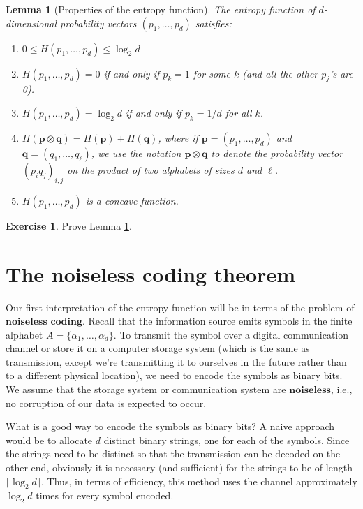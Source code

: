 \documentclass[11pt]{report}
\theoremstyle{plain}
\newtheorem{lem}[thm]{Lemma}
\theoremstyle{definition}
\newtheorem{xexercise}[thm]{Exercise}
\begin{document}
\begin{lem}[Properties of the entropy function]
\label{lem-entropy-properties}
The entropy function of $d$-dimensional probability vectors $(p_1,\ldots,p_d)$ satisfies:

\begin{enumerate}[label=\arabic*.]
\item $0 \le H(p_1,\ldots,p_d) \le \log_2 d$
\item $H(p_1,\ldots,p_d)=0$ if and only if $p_k=1$ for some $k$ (and all the other $p_j$'s are 0).
\item $H(p_1,\ldots,p_d)=\log_2 d$ if and only if $p_k=1/d$ for all $k$.
\item $H(\mathbf{p}\otimes \mathbf{q}) = H(\mathbf{p}) + H(\mathbf{q})$, where if $\mathbf{p}=(p_1,\ldots,p_d)$ and $\mathbf{q}=(q_1,\ldots,q_\ell)$, we use the notation $\mathbf{p}\otimes\mathbf{q}$ to denote the probability vector $(p_i q_j)_{i,j}$ on the product of two alphabets of sizes $d$ and $\ell$.
\item $H(p_1,\ldots,p_d)$ is a concave function.
\end{enumerate}

\end{lem}

\begin{xexercise}
Prove Lemma \ref{lem-entropy-properties}.
\end{xexercise}

\section{The noiseless coding theorem}
Our first interpretation of the entropy function will be in terms of the problem of $\textbf{noiseless coding}$. Recall that the information source emits symbols in the finite alphabet $A=\{\alpha_1,\ldots,\alpha_d\}$. To transmit the symbol over a digital communication channel or store it on a computer storage system (which is the same as transmission, except we're transmitting it to ourselves in the future rather than to a different physical location), we need to encode the symbols as binary bits. We assume that the storage system or communication system are $\textbf{noiseless}$, i.e., no corruption of our data is expected to occur.

What is a good way to encode the symbols as binary bits? A naive approach would be to allocate $d$ distinct binary strings, one for each of the symbols. Since the strings need to be distinct so that the transmission can be decoded on the other end, obviously it is necessary (and sufficient) for the strings to be of length $\lceil \log_2 d\rceil$. Thus, in terms of efficiency, this method uses the channel approximately $\log_2 d$ times for every symbol encoded.
\end{document}
